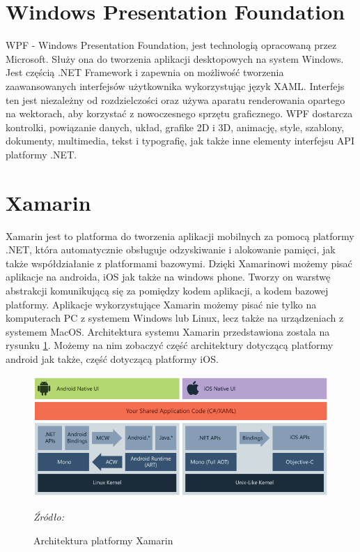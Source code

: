 \documentclass[12pt,oneside]{report}
\begin{document}
\section{Windows Presentation Foundation}
WPF - Windows Presentation Foundation, jest technologią opracowaną przez Microsoft. Służy ona do tworzenia aplikacji desktopowych na system Windows. Jest częścią .NET Framework i zapewnia on możliwość tworzenia zaawansowanych interfejsów użytkownika wykorzystując język XAML. Interfejs ten jest niezależny od rozdzielczości oraz używa aparatu renderowania opartego na wektorach, aby korzystać z nowoczesnego sprzętu graficznego. WPF dostarcza kontrolki, powiązanie danych, układ, grafike 2D i 3D, animację, style, szablony, dokumenty, multimedia, tekst i typografię, jak także inne elementy interfejsu API platformy .NET. \cite{WPF}

\section{Xamarin}
Xamarin jest to platforma do tworzenia aplikacji mobilnych za pomocą platformy .NET, która automatycznie obsługuje odzyskiwanie i alokowanie pamięci, jak także współdziałanie z platformami bazowymi. Dzięki Xamarinowi możemy pisać aplikacje na androida, iOS jak także na windows phone. Tworzy on warstwę abstrakcji komunikującą się za pomiędzy kodem aplikacji, a kodem bazowej platformy. Aplikacje wykorzystujące Xamarin możemy pisać nie tylko na komputerach PC z systemem Windows lub Linux, lecz także na urządzeniach z systemem MacOS. Architektura systemu Xamarin przedstawiona zostala na rysunku \ref{XamarinArchitecture}. Możemy na nim zobaczyć część architektury dotyczącą platformy android jak także, część dotyczącą platformy iOS.\cite{XamarinLearn}
\begin{figure}[H]
	\centering
	\includegraphics[scale=0.5]{xamarinArchitecture}
	\caption{Architektura platformy Xamarin}
	\textit{Źródło: \cite{XamarinLearn}}
	\label{XamarinArchitecture}
\end{figure}
\end{document}
